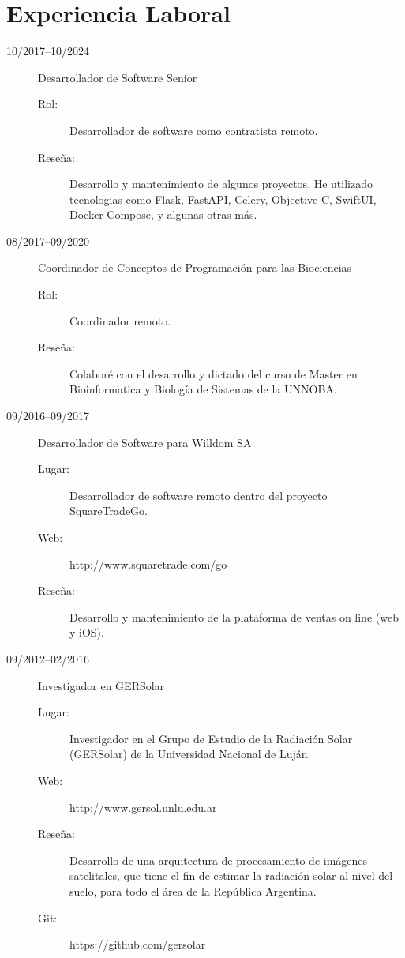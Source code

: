 \documentclass[a4paper]{article}
\begin{document}
\section{Experiencia Laboral}
\begin{description}
\item[10/2017--10/2024] Desarrollador de Software Senior
	\begin{description}
	\item[Rol: ] Desarrollador de software como contratista remoto.
	\item[Rese\~na: ]  Desarrollo y mantenimiento de algunos proyectos. He utilizado tecnologias como Flask, FastAPI, Celery, Objective C, SwiftUI, Docker Compose, y algunas otras m{\'a}s.
	\end{description}
\item[08/2017--09/2020] Coordinador de Conceptos de Programaci{\'o}n para las Biociencias
	\begin{description}
	\item[Rol: ] Coordinador remoto.
	\item[Rese\~na: ]  Colabor{\'e} con el desarrollo y dictado del curso de Master en Bioinformatica y Biolog{\'i}a de Sistemas de la UNNOBA.
	\end{description}
\item[09/2016--09/2017] Desarrollador de Software para Willdom SA
	\begin{description}
	\item[Lugar: ] Desarrollador de software remoto dentro del proyecto SquareTradeGo.
	\item[Web: ] http://www.squaretrade.com/go
	\item[Rese\~na: ]  Desarrollo y mantenimiento de la plataforma de ventas on line (web y iOS).
	\end{description}
\item[09/2012--02/2016] Investigador en GERSolar
	\begin{description}
	\item[Lugar: ] Investigador en el Grupo de Estudio de la Radiaci{\'o}n Solar (GERSolar) de la Universidad Nacional de Luj{\'a}n.
	\item[Web: ] http://www.gersol.unlu.edu.ar
	\item[Rese\~na: ]  Desarrollo de una arquitectura de procesamiento de im{\'a}genes satelitales, que tiene el fin  de estimar la radiaci{\'o}n solar al nivel del suelo, para todo el {\'a}rea de la Rep{\'u}blica Argentina.
	\item[Git: ] https://github.com/gersolar

\end{description}
\end{description}
\end{document}
